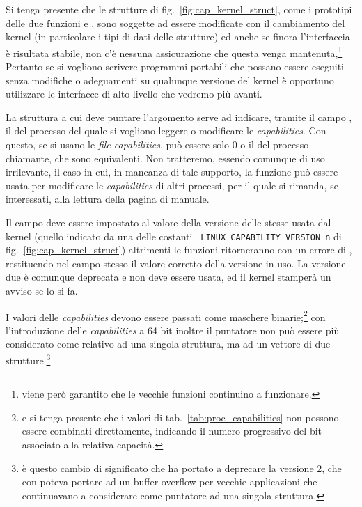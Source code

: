 Si tenga presente che le strutture di fig.~\ref{fig:cap_kernel_struct}, come i
prototipi delle due funzioni  e , sono soggette ad
essere modificate con il cambiamento del kernel (in particolare i tipi di dati
delle strutture) ed anche se finora l'interfaccia è risultata stabile, non c'è
nessuna assicurazione che questa venga mantenuta,\footnote{viene però
  garantito che le vecchie funzioni continuino a funzionare.} Pertanto se si
vogliono scrivere programmi portabili che possano essere eseguiti senza
modifiche o adeguamenti su qualunque versione del kernel è opportuno
utilizzare le interfacce di alto livello che vedremo più avanti.

La struttura a cui deve puntare l'argomento  serve ad indicare,
tramite il campo , il  del processo del quale si vogliono
leggere o modificare le \textit{capabilities}. Con  questo, se si
usano le \textit{file capabilities}, può essere solo 0 o il  del
processo chiamante, che sono equivalenti. Non tratteremo, essendo comunque di
uso irrilevante, il caso in cui, in mancanza di tale supporto, la funzione può
essere usata per modificare le \textit{capabilities} di altri processi, per il
quale si rimanda, se interessati, alla lettura della pagina di manuale.

Il campo  deve essere impostato al valore della versione delle
stesse usata dal kernel (quello indicato da una delle costanti
\texttt{\_LINUX\_CAPABILITY\_VERSION\_n} di fig.~\ref{fig:cap_kernel_struct})
altrimenti le funzioni ritorneranno con un errore di ,
restituendo nel campo stesso il valore corretto della versione in uso. La
versione due è comunque deprecata e non deve essere usata, ed il kernel
stamperà un avviso se lo si fa.

I valori delle \textit{capabilities} devono essere passati come maschere
binarie;\footnote{e si tenga presente che i valori di
  tab.~\ref{tab:proc_capabilities} non possono essere combinati direttamente,
  indicando il numero progressivo del bit associato alla relativa capacità.}
con l'introduzione delle \textit{capabilities} a 64 bit inoltre il
puntatore  non può essere più considerato come relativo ad una
singola struttura, ma ad un vettore di due strutture.\footnote{è questo cambio
  di significato che ha portato a deprecare la versione 2, che con
   poteva portare ad un buffer overflow per vecchie applicazioni
  che continuavano a considerare  come puntatore ad una singola
  struttura.}

